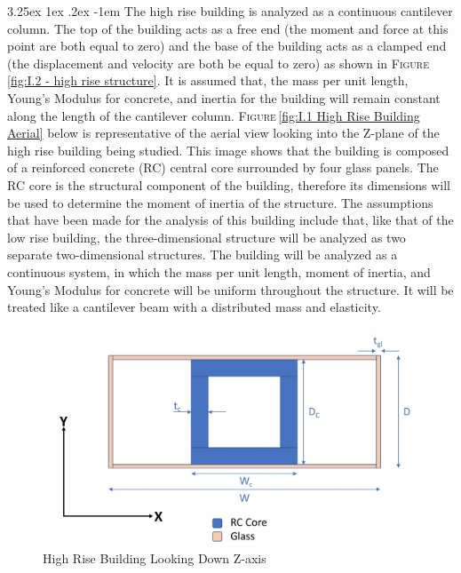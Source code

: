\documentclass[11pt,a4paper,titlepage]{report}
\makeatletter
\renewcommand\paragraph{\@startsection{paragraph}{5}{\z@}%
  {3.25ex \@plus1ex \@minus.2ex}%
  {-1em}%
  {\normalfont\normalsize\bfseries}}
\makeatother
\begin{document}
\paragraph{}The high rise building is analyzed as a continuous cantilever column. The top of the building acts as a free end (the moment and force at this point are both equal to zero) and the base of the building acts as a clamped end (the displacement and velocity are both be equal to zero) as shown in \textsc{Figure}\,\ref{fig:I.2 - high rise structure}. It is assumed that, the mass per unit length, Young's Modulus for concrete, and inertia for the building will remain constant along the length of the cantilever column. \textsc{Figure}\,\ref{fig:I.1 High Rise Building Aerial} below is representative of the aerial view looking into the Z-plane of the high rise building being studied. This image shows that the building is composed of a reinforced concrete (RC) central core surrounded by four glass panels. The RC core is the structural component of the building, therefore its dimensions will be used to determine the moment of inertia of the structure. The assumptions that have been made for the analysis of this building include that, like that of the low rise building, the three-dimensional structure will be analyzed as two separate two-dimensional structures. The building will be analyzed as a continuous system, in which the mass per unit length, moment of inertia, and Young's Modulus for concrete will be uniform throughout the structure. It will be treated like a cantilever beam with a distributed mass and elasticity. 
\begin{figure} [h]
    \centering
    \includegraphics[width=14cm]{High_Rise_z.jpeg}
    \caption{High Rise Building Looking Down Z-axis}
    \label{fig:I.1  High Rise Building Aerial}
\end{figure}
\end{document}
